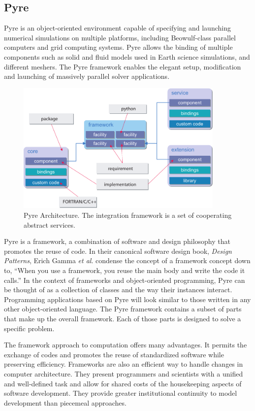 \subsection{Pyre}

Pyre is an object-oriented environment capable of specifying and launching
numerical simulations on multiple platforms, including Beowulf-class
parallel computers and grid computing systems. Pyre allows the binding
of multiple components such as solid and fluid models used in Earth
science simulations, and different meshers. The Pyre framework enables
the elegant setup, modification and launching of massively parallel
solver applications.

\begin{figure}[htbp]
  \includegraphics[width=4in]{intro/figs/pyre_overview}
  \caption{Pyre Architecture. The integration framework is a set of
    cooperating abstract services.}
  \label{fig:Pyre:Architecture}
\end{figure}

Pyre is a framework, a combination of software and design philosophy
that promotes the reuse of code. In their canonical software design
book, \emph{Design Patterns}, Erich Gamma \textit{et al}. condense
the concept of a framework concept down to, ``When you use a framework,
you reuse the main body and write the code it calls.'' In the context
of frameworks and object-oriented programming, Pyre can be thought
of as a collection of classes and the way their instances interact.
Programming applications based on Pyre will look similar to those
written in any other object-oriented language. The Pyre framework
contains a subset of parts that make up the overall framework. Each
of those parts is designed to solve a specific problem.

The framework approach to computation offers many advantages. It permits
the exchange of codes and promotes the reuse of standardized software
while preserving efficiency. Frameworks are also an efficient way
to handle changes in computer architecture. They present programmers
and scientists with a unified and well-defined task and allow for
shared costs of the housekeeping aspects of software development.
They provide greater institutional continuity to model development
than piecemeal approaches.

